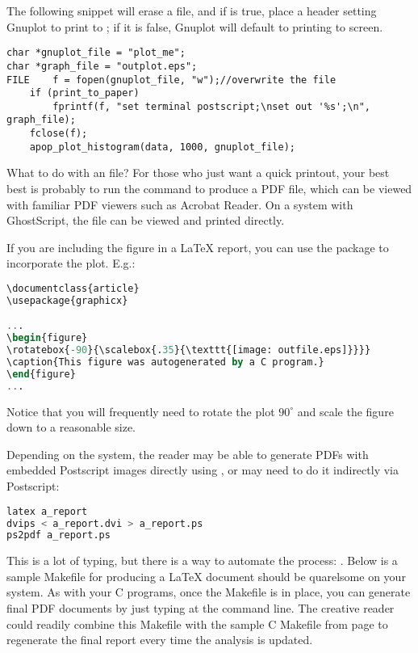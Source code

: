 The following snippet will erase a file, and
if  is true, place a header setting Gnuplot to
print to ; if it is false, Gnuplot will default
to printing to screen.

\begin{lstlisting}
char *gnuplot_file = "plot_me";
char *graph_file = "outplot.eps";
FILE    f = fopen(gnuplot_file, "w");//overwrite the file
    if (print_to_paper)
        fprintf(f, "set terminal postscript;\nset out '%s';\n", graph_file);
    fclose(f);
    apop_plot_histogram(data, 1000, gnuplot_file);
\end{lstlisting}

What to do with an  file? For those who just want a quick
printout, your best best is probably to run the command 
to produce a PDF file, which can be viewed with familiar PDF viewers
such as Acrobat Reader. On a system with GhostScript, the  file
can be viewed and printed directly.

 
If you are including the  figure in a \LaTeX{} report, you can use the
 package to incorporate the plot. E.g.:
\begin{lstlisting}[language=sql]
\documentclass{article}
\usepackage{graphicx}

...
\begin{figure}
\rotatebox{-90}{\scalebox{.35}{\texttt{[image: outfile.eps]}}}}
\caption{This figure was autogenerated by a C program.}
\end{figure}
...

\end{lstlisting}
Notice that you will frequently need to rotate the plot $90^\circ$
and scale the figure down to a reasonable size.

Depending on the system, the reader may be able to generate PDFs with
embedded Postscript images directly using , or may
need to do it indirectly via Postscript: 
\begin{lstlisting}[language=sql]
latex a_report
dvips < a_report.dvi > a_report.ps
ps2pdf a_report.ps
\end{lstlisting}

This is a lot of typing, but there is a way to automate the process:
. Below is a sample Makefile for producing a \LaTeX{} document
should  be quarelsome on your system. As with your C
programs, once the Makefile is in place, you can generate final PDF
documents by just typing  at the command line. The
creative reader could readily combine this Makefile with the sample C
Makefile from page \pageref{make} to regenerate the final report every
time the analysis is updated.

